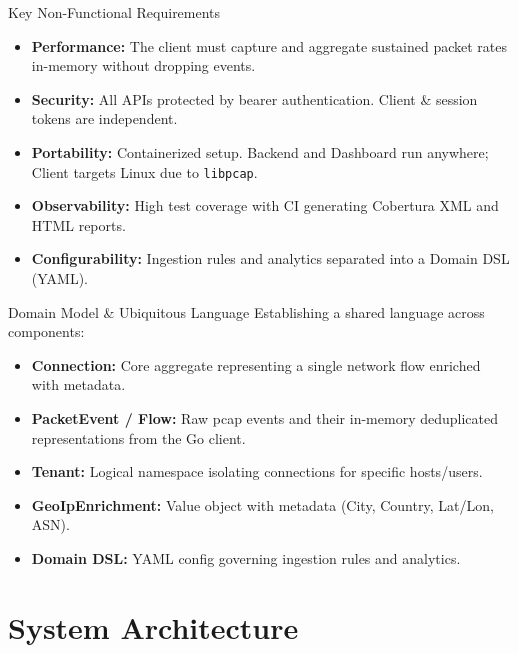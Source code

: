 \documentclass[aspectratio=169]{beamer}
\begin{document}
\begin{frame}{Key Non-Functional Requirements}
    \begin{itemize}
        \item \textbf{Performance:} The client must capture and aggregate sustained packet rates in-memory without dropping events.
        \item \textbf{Security:} All APIs protected by bearer authentication. Client \& session tokens are independent.
        \item \textbf{Portability:} Containerized setup. Backend and Dashboard run anywhere; Client targets Linux due to \texttt{libpcap}.
        \item \textbf{Observability:} High test coverage with CI generating Cobertura XML and HTML reports.
        \item \textbf{Configurability:} Ingestion rules and analytics separated into a Domain DSL (YAML).
    \end{itemize}
\end{frame}

\begin{frame}{Domain Model \& Ubiquitous Language}
    Establishing a shared language across components:
    \vspace{0.3cm}
    \begin{itemize}
        \item \textbf{Connection:} Core aggregate representing a single network flow enriched with metadata.
        \item \textbf{PacketEvent / Flow:} Raw pcap events and their in-memory deduplicated representations from the Go client.
        \item \textbf{Tenant:} Logical namespace isolating connections for specific hosts/users.
        \item \textbf{GeoIpEnrichment:} Value object with metadata (City, Country, Lat/Lon, ASN).
        \item \textbf{Domain DSL:} YAML config governing ingestion rules and analytics.
    \end{itemize}
\end{frame}

\section{System Architecture}
\end{document}
